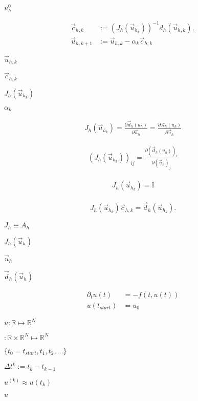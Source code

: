 \documentclass{article}
\begin{document}
$u_h^0$
\pagebreak

\begin{align*} \vec{c}_{h,k} &:= (J_h(\vec{u}_{h_k}))^{-1} d_h(\vec{u}_{h,k}),\\ \vec{u}_{h,k+1} &:= \vec{u}_{h,k} - \alpha_k \vec{c}_{h,k} \end{align*}
\pagebreak

$\vec{u}_{h,k}$
\pagebreak

$\vec{c}_{h,k}$
\pagebreak

$J_h(\vec{u}_{h_k})$
\pagebreak

$ \alpha_k$
\pagebreak

\begin{align*} J_h(\vec{u}_{h_k}) = \frac{\partial \vec{d}_h(u_h)}{\partial \vec{u}_h} = \frac{\partial \mathcal{A}_h(u_h)}{\partial \vec{u}_h} \end{align*}
\pagebreak

\begin{align*} (J_h(\vec{u}_{h_k}))_{ij} = \frac{\partial (\vec{d}_h(u_h))_i}{\partial (\vec{u}_h)_j} \end{align*}
\pagebreak

\begin{align*} J_h(\vec{u}_{h_k}) = \mathbb{I} \end{align*}
\pagebreak

\begin{align*} J_h(\vec{u}_{h_k}) \vec{c}_{h,k} = \vec{d}_h(\vec{u}_{h_k}). \end{align*}
\pagebreak

$J_h \equiv A_h$
\pagebreak

$J_h(\vec{u}_h)$
\pagebreak

$\vec{u}_h$
\pagebreak

$\vec{d}_h(\vec{u}_h)$
\pagebreak

\begin{align*} \partial_t u(t) &= - f(t, u(t)) \\ u(t_{start}) &= u_0 \end{align*}
\pagebreak

$u: \mathbb{R} \mapsto \mathbb{R}^N$
\pagebreak

$: \mathbb{R} \times \mathbb{R}^N \mapsto \mathbb{R}^N$
\pagebreak

$\{t_0 = t_{start}, t_1, t_2, \ldots \}$
\pagebreak

$\Delta t^k := t_{k} - t_{k-1}$
\pagebreak

$u^{(k)} \approx u(t_k)$
\pagebreak

$u$
\pagebreak
\end{document}
